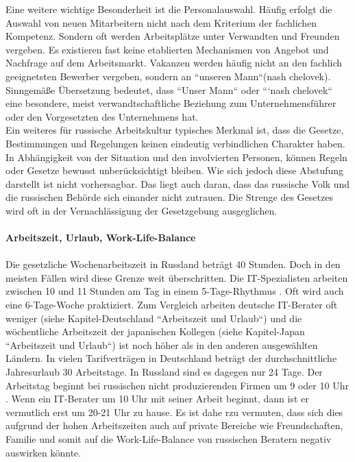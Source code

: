 	 Eine weitere wichtige Besonderheit ist die Personalauswahl. Häufig erfolgt die Auswahl von neuen Mitarbeitern nicht nach dem Kriterium der fachlichen Kompetenz. Sondern oft werden Arbeitsplätze unter Verwandten und 
	 Freunden vergeben. Es existieren fast keine etablierten Mechanismen von Angebot und Nachfrage auf dem Arbeitsmarkt. Vakanzen werden häufig nicht an den fachlich geeignetsten Bewerber vergeben, sondern an ``unseren Mann``(nash chelovek). Sinngemäße Übersetzung bedeutet, dass ``Unser Mann`` oder ```nash chelovek`` eine besondere, meist verwandtschaftliche Beziehung zum Unternehmensführer oder den Vorgesetzten des Unternehmens hat.\\
	 Ein weiteres für russische Arbeitskultur typisches Merkmal ist, dass die Gesetze, Bestimmungen und Regelungen keinen eindeutig verbindlichen Charakter haben. In Abhängigkeit von der Situation und den involvierten Personen, können Regeln oder Gesetze bewusst unberücksichtigt bleiben. Wie sich jedoch diese Abstufung darstellt ist nicht vorhersagbar. Das liegt auch daran, dass das russische Volk und die russischen Behörde sich einander nicht zutrauen. Die Strenge des Gesetzes wird oft in der Vernachlässigung der Gesetzgebung ausgeglichen. \cite{ProzessbeglBerRU}\\ \\ 
	 \textbf{Arbeitszeit, Urlaub, Work-Life-Balance}\\ %
	 \\
	 Die gesetzliche Wochenarbeitszeit in Russland beträgt 40 Stunden. Doch in den meisten Fällen wird diese Grenze weit überschritten. Die IT-Spezialisten arbeiten zwischen 10 und 11 Stunden am Tag in einem 5-Tage-Rhythmus \cite{ArbZeitRU}. 
	  Oft wird auch eine 6-Tage-Woche praktiziert. Zum Vergleich arbeiten deutsche IT-Berater oft weniger (siehe Kapitel-Deutschland ``Arbeitszeit und Urlaub``) und die wöchentliche Arbeitszeit der japanischen Kollegen (siehe Kapitel-Japan ``Arbeitszeit und Urlaub``) ist noch höher als in den anderen ausgewählten Ländern. 
	 In vielen Tarifverträgen in Deutschland beträgt der durchschnittliche Jahresurlaub 30 Arbeitstage. In Russland sind es dagegen nur 24 Tage. Der Arbeitstag beginnt bei russischen nicht produzierenden Firmen um 9 oder 10 Uhr \cite{ArbZeitRU}. Wenn ein IT-Berater um 10 Uhr mit seiner Arbeit beginnt, dann ist er vermutlich erst um 20-21 Uhr zu hause. Es ist dahe rzu vermuten, dass sich dies aufgrund der  hohen Arbeitszeiten auch auf private Bereiche wie Freundschaften, Familie und somit auf die Work-Life-Balance von russischen Beratern negativ auswirken könnte.   \\ 
